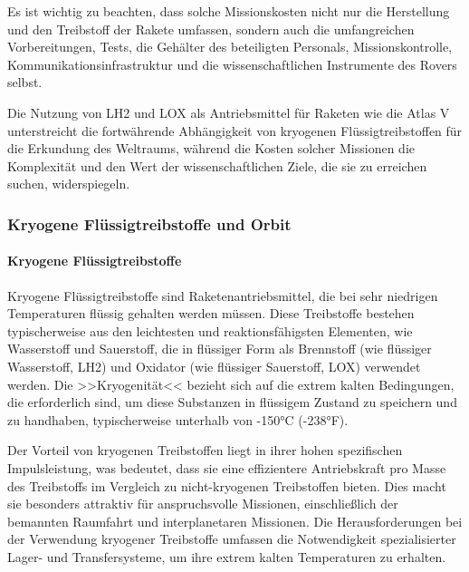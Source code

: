 \documentclass{vorlage-design-main}
\begin{document}
Es ist wichtig zu beachten, dass solche Missionskosten nicht nur die
Herstellung und den Treibstoff der Rakete umfassen, sondern auch die
umfangreichen Vorbereitungen, Tests, die Gehälter des beteiligten
Personals, Missionskontrolle, Kommunikationsinfrastruktur und die
wissenschaftlichen Instrumente des Rovers selbst.

Die Nutzung von LH2 und LOX als Antriebsmittel für Raketen wie die Atlas
V unterstreicht die fortwährende Abhängigkeit von kryogenen
Flüssigtreibstoffen für die Erkundung des Weltraums, während die Kosten
solcher Missionen die Komplexität und den Wert der wissenschaftlichen
Ziele, die sie zu erreichen suchen, widerspiegeln.

\hypertarget{kryogene-fluxfcssigtreibstoffe-und-orbit}{%
\subsubsection{Kryogene Flüssigtreibstoffe und
Orbit}\label{kryogene-fluessigtreibstoffe-und-orbit}}

\hypertarget{kryogene-fluxfcssigtreibstoffe}{%
\paragraph{Kryogene
Flüssigtreibstoffe}\label{kryogene-fluessigtreibstoffe}}

Kryogene Flüssigtreibstoffe sind Raketenantriebsmittel, die bei sehr
niedrigen Temperaturen flüssig gehalten werden müssen. Diese Treibstoffe
bestehen typischerweise aus den leichtesten und reaktionsfähigsten
Elementen, wie Wasserstoff und Sauerstoff, die in flüssiger Form als
Brennstoff (wie flüssiger Wasserstoff, LH2) und Oxidator (wie flüssiger
Sauerstoff, LOX) verwendet werden. Die >>Kryogenität<< bezieht sich auf
die extrem kalten Bedingungen, die erforderlich sind, um diese
Substanzen in flüssigem Zustand zu speichern und zu handhaben,
typischerweise unterhalb von -150°C (-238°F).

Der Vorteil von kryogenen Treibstoffen liegt in ihrer hohen spezifischen
Impulsleistung, was bedeutet, dass sie eine effizientere Antriebskraft
pro Masse des Treibstoffs im Vergleich zu nicht-kryogenen Treibstoffen
bieten. Dies macht sie besonders attraktiv für anspruchsvolle Missionen,
einschließlich der bemannten Raumfahrt und interplanetaren Missionen.
Die Herausforderungen bei der Verwendung kryogener Treibstoffe umfassen
die Notwendigkeit spezialisierter Lager- und Transfersysteme, um ihre
extrem kalten Temperaturen zu erhalten.
\end{document}
